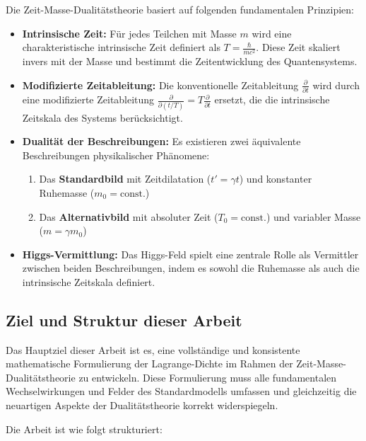 \documentclass[a4paper,12pt]{article}
\begin{document}
	Die Zeit-Masse-Dualitätstheorie basiert auf folgenden fundamentalen Prinzipien:
	
	\begin{itemize}
		\item \textbf{Intrinsische Zeit:} Für jedes Teilchen mit Masse \( m \) wird eine charakteristische intrinsische Zeit definiert als \( T = \frac{\hbar}{mc^2} \). Diese Zeit skaliert invers mit der Masse und bestimmt die Zeitentwicklung des Quantensystems.
		\item \textbf{Modifizierte Zeitableitung:} Die konventionelle Zeitableitung \( \frac{\partial}{\partial t} \) wird durch eine modifizierte Zeitableitung \( \frac{\partial}{\partial(t/T)} = T \frac{\partial}{\partial t} \) ersetzt, die die intrinsische Zeitskala des Systems berücksichtigt.
		\item \textbf{Dualität der Beschreibungen:} Es existieren zwei äquivalente Beschreibungen physikalischer Phänomene:
		\begin{enumerate}
			\item Das \textbf{Standardbild} mit Zeitdilatation (\( t' = \gamma t \)) und konstanter Ruhemasse (\( m_0 = \text{const.} \))
			\item Das \textbf{Alternativbild} mit absoluter Zeit (\( T_0 = \text{const.} \)) und variabler Masse (\( m = \gamma m_0 \))
		\end{enumerate}
		\item \textbf{Higgs-Vermittlung:} Das Higgs-Feld spielt eine zentrale Rolle als Vermittler zwischen beiden Beschreibungen, indem es sowohl die Ruhemasse als auch die intrinsische Zeitskala definiert.
	\end{itemize}
	
	\subsection{Ziel und Struktur dieser Arbeit}
	
	Das Hauptziel dieser Arbeit ist es, eine vollständige und konsistente mathematische Formulierung der Lagrange-Dichte im Rahmen der Zeit-Masse-Dualitätstheorie zu entwickeln. Diese Formulierung muss alle fundamentalen Wechselwirkungen und Felder des Standardmodells umfassen und gleichzeitig die neuartigen Aspekte der Dualitätstheorie korrekt widerspiegeln.
	
	Die Arbeit ist wie folgt strukturiert:
	
\end{document}
